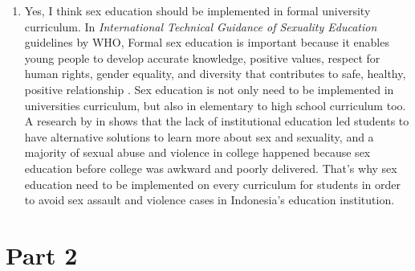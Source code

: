 \documentclass[12pt]{article}
\begin{document}
\begin{refsection}
\begin{enumerate}
            \item
            Yes, I think sex education should be implemented in formal university 
            curriculum. In \emph{International Technical Guidance of Sexuality Education}
            guidelines by WHO, Formal sex education is important because it
            enables young people to develop accurate knowledge, positive values,
            respect for human rights, gender equality, and diversity that
            contributes to safe, healthy, positive relationship \parencite{whoInternationalTechnicalGuidance2018}.
            Sex education is not only need to be implemented in universities
            curriculum, but also in elementary to high school curriculum too. A
            research by \citeauthor[]{santelliDoesSexEducation2018} in
            \citeyear{santelliDoesSexEducation2018} shows that the lack of
            institutional education led students to have alternative solutions to
            learn more about sex and sexuality, and a majority of sexual abuse
            and violence in college happened because sex education before
            college was awkward and poorly delivered. That's why sex education
            need to be implemented on every curriculum for students in order to
            avoid sex assault and violence cases in Indonesia's education institution.
        \end{enumerate}
        \nocite{
            bbcnewsindonesiaMengapaTanpaPersetujuan2021,
        }
        \pagebreak
        \printbibliography[title=First Part References]
    \end{refsection}

    \pagebreak
    \section*{Part 2}
\end{document}
